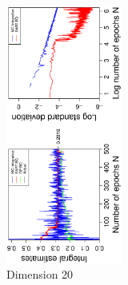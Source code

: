 \vspace{-0.5cm}
\begin{figure}[H]
  \centering
   \hspace{1.3cm}
    \includegraphics[width = 0.34\textwidth, angle = -90]{report/Figures/3/convergenceMean320Dimensions.eps}
     \vspace{-1cm}
     \caption{Dimension 20}
\end{figure}




